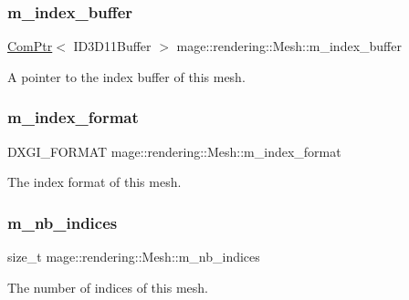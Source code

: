 \subsubsection{\texorpdfstring{m\+\_\+index\+\_\+buffer}{m\_index\_buffer}}
{\footnotesize\ttfamily \hyperlink{namespacemage_ae74f374780900893caa5555d1031fd79}{Com\+Ptr}$<$ I\+D3\+D11\+Buffer $>$ mage\+::rendering\+::\+Mesh\+::m\+\_\+index\+\_\+buffer\hspace{0.3cm}{\ttfamily [protected]}}

A pointer to the index buffer of this mesh. \hypertarget{classmage_1_1rendering_1_1_mesh_a3de0213af57c9d423399ad22fd6ae7c0}{}\label{classmage_1_1rendering_1_1_mesh_a3de0213af57c9d423399ad22fd6ae7c0} 
\subsubsection{\texorpdfstring{m\+\_\+index\+\_\+format}{m\_index\_format}}
{\footnotesize\ttfamily D\+X\+G\+I\+\_\+\+F\+O\+R\+M\+AT mage\+::rendering\+::\+Mesh\+::m\+\_\+index\+\_\+format\hspace{0.3cm}{\ttfamily [private]}}

The index format of this mesh. \hypertarget{classmage_1_1rendering_1_1_mesh_a103e49bac28a4551816ec453e7261213}{}\label{classmage_1_1rendering_1_1_mesh_a103e49bac28a4551816ec453e7261213} 
\subsubsection{\texorpdfstring{m\+\_\+nb\+\_\+indices}{m\_nb\_indices}}
{\footnotesize\ttfamily size\+\_\+t mage\+::rendering\+::\+Mesh\+::m\+\_\+nb\+\_\+indices\hspace{0.3cm}{\ttfamily [private]}}

The number of indices of this mesh. \hypertarget{classmage_1_1rendering_1_1_mesh_a877873f0736375cdaa2d26066d7aa2ae}{}\label{classmage_1_1rendering_1_1_mesh_a877873f0736375cdaa2d26066d7aa2ae} 

